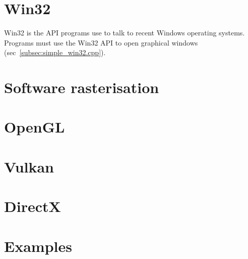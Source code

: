 \documentclass{article}
\begin{document}
\section{Win32}
\label{sec:win32}

Win32 is the API programs use to talk to recent Windows operating systems.
Programs must use the Win32 API to open graphical windows
(sec~\ref{subsec:simple_win32.cpp}).


\section{Software rasterisation}
\label{sec:software-rasterisation}


\section{OpenGL}
\label{sec:opengl}


\section{Vulkan}
\label{sec:vulkan}


\section{DirectX}
\label{sec:directx}


\section{Examples}
\label{sec:examples}
\end{document}
